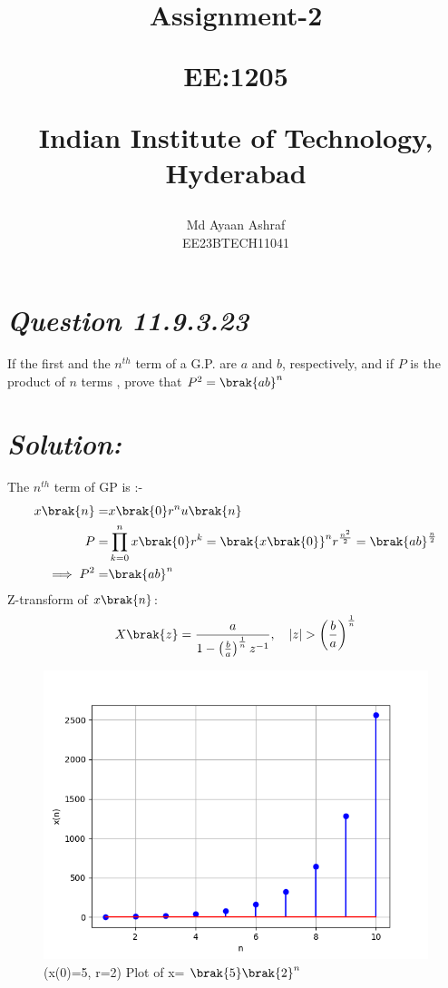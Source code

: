 \documentclass[journal,12pt,twocolumn]{IEEEtran}
\theoremstyle{remark}
\begin{document}
%




\vspace{3cm}

\title{
Assignment-2

\large{EE:1205 }

Indian Institute of Technology, Hyderabad
}
\author{Md Ayaan Ashraf

EE23BTECH11041
}  
\maketitle
\newpage
\bigskip
\renewcommand{\thefigure}{\arabic{figure}}
\renewcommand{\thetable}{\arabic{table}}
\section*{\textit{\textbf{Question 11.9.3.23}}}
 If the first and the  $n^{th}$  term of a G.P. are $a$ and $b$, respectively, and if $P$ is the product of $n$ terms , prove that $ P^2 = \brak{ab}^n $
\section*{\textit{\textbf{Solution:}}}
\fi

The  $n^{th}$ term of GP is :-
\begin{align}
x\brak{n} = & x\brak{0}r^{n} u\brak{n}\\
P =& \prod_{k=0}^{n} x\brak{0}r^{k}= \brak{x\brak{0}}^n r^{\frac{n^2}{2}}= \brak{ab}^{\frac{n}{2}}\\
\implies  P^2 =& \brak{ab}^n 
\end {align}
Z-transform of $x\brak{n}$:
\begin{align}
X\brak{z}= \frac{a}{1-\left(\frac{b}{a}\right)^{\frac{1}{n}}{z^{-1}}} , \quad{|z|>\left(\frac{b}{a}\right)^{\frac{1}{n}}}
\end{align}
\begin{figure}[ht]
    \centering
    \includegraphics[width=\columnwidth]{ncert-maths/11/9/3/23/figs/fig.png}
    \caption{(x(0)=5, r=2) Plot of x= $\brak{5}\brak{2}^n$}
    \label{fig: 11.9.3.23}
\end{figure}
\end{document}
